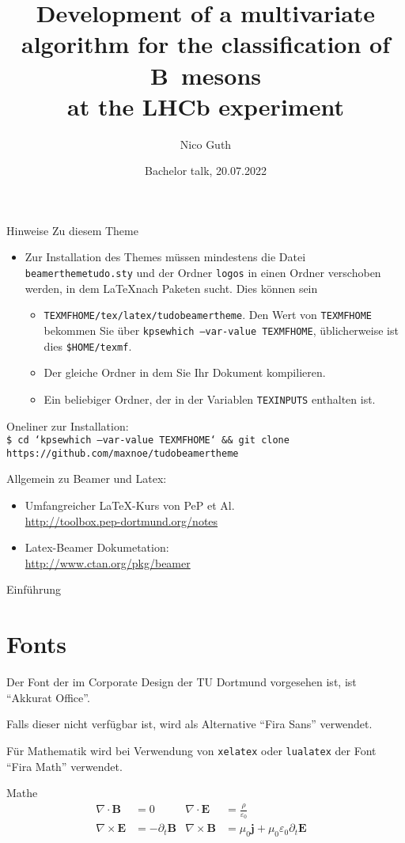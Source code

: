 \documentclass[aspectratio=1610, 9pt]{beamer}
\title{Development of a multivariate algorithm for the classification of B~mesons\\at the LHCb experiment}
\author[N.~Guth]{Nico Guth}
\institute[AG Albrecht]{Arbeitsgruppe Albrecht \\ Fakultät Physik}
\date{Bachelor talk, 20.07.2022}
\begin{document}
\maketitle

\begin{frame}{Hinweise}
  Zu diesem Theme
  \begin{itemize}
    \item Zur Installation des Themes müssen mindestens die Datei \texttt{beamerthemetudo.sty} und der Ordner \texttt{logos} in einen Ordner verschoben werden, in dem \LaTeX nach Paketen sucht.
      Dies können sein
      \begin{itemize}
        \item \texttt{TEXMFHOME/tex/latex/tudobeamertheme}. Den Wert von \texttt{TEXMFHOME} bekommen Sie über \texttt{kpsewhich --var-value TEXMFHOME}, üblicherweise ist dies \texttt{\$HOME/texmf}.
        \item Der gleiche Ordner in dem Sie Ihr Dokument kompilieren.
        \item Ein beliebiger Ordner, der in der Variablen \texttt{TEXINPUTS} enthalten ist.
      \end{itemize}
  \end{itemize}
  
  Oneliner zur Installation:\\
  \texttt{\footnotesize\$ cd `kpsewhich --var-value TEXMFHOME` \&\& git clone https://github.com/maxnoe/tudobeamertheme}

  \medskip
  Allgemein zu Beamer und Latex:
  \begin{itemize}
    \item Umfangreicher \LaTeX-Kurs von PeP et Al. \\
      \url{http://toolbox.pep-dortmund.org/notes}
    \item Latex-Beamer Dokumetation:\\
    \url{http://www.ctan.org/pkg/beamer}
  \end{itemize}
\end{frame}

\begin{frame}{Einführung}
  \tableofcontents
\end{frame}

\section{Fonts}
\begin{frame}
  Der Font der im Corporate Design der TU Dortmund vorgesehen ist,
  ist \enquote{Akkurat Office}.

  Falls dieser nicht verfügbar ist, wird als Alternative \enquote{Fira Sans}
  verwendet.

  Für Mathematik wird bei Verwendung von \texttt{xelatex} oder \texttt{lualatex} der Font \enquote{Fira Math} verwendet.
\end{frame}

\begin{frame}{Mathe}
  \begin{align*}
    \nabla \cdot \symbf{B} &= 0 &
    \nabla \cdot \symbf{E} &= \frac{ρ}{ε_0} \\
    \nabla \times \symbf{E} &= -\partial_t \symbf{B} &
    \nabla \times \symbf{B} &= μ_0 \symbf{j} + μ_0 ε_0 \partial_t \symbf{E} &
  \end{align*}
\end{frame}
\end{document}
